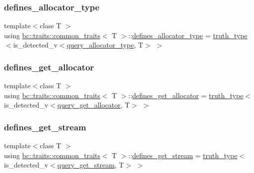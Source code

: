 \subsubsection{\texorpdfstring{defines\+\_\+allocator\+\_\+type}{defines\_allocator\_type}}
{\footnotesize\ttfamily template$<$class T $>$ \\
using \hyperlink{structbc_1_1traits_1_1common__traits}{bc\+::traits\+::common\+\_\+traits}$<$ T $>$\+::\hyperlink{structbc_1_1traits_1_1common__traits_a34ec53adbbda52eb2f30cb3ea1e07aac}{defines\+\_\+allocator\+\_\+type} =  \hyperlink{namespacebc_1_1traits_ac91a9795000ae7f483efbaf74c9872e8}{truth\+\_\+type}$<$is\+\_\+detected\+\_\+v$<$\hyperlink{namespacebc_1_1traits_ab141f0cc8348b4b7ebcb48e6bbb50d09}{query\+\_\+allocator\+\_\+type}, T$>$ $>$}

\mbox{\label{structbc_1_1traits_1_1common__traits_a411e56449816c80e601cd7b0a177d274}} 
\subsubsection{\texorpdfstring{defines\+\_\+get\+\_\+allocator}{defines\_get\_allocator}}
{\footnotesize\ttfamily template$<$class T $>$ \\
using \hyperlink{structbc_1_1traits_1_1common__traits}{bc\+::traits\+::common\+\_\+traits}$<$ T $>$\+::\hyperlink{structbc_1_1traits_1_1common__traits_a411e56449816c80e601cd7b0a177d274}{defines\+\_\+get\+\_\+allocator} =  \hyperlink{namespacebc_1_1traits_ac91a9795000ae7f483efbaf74c9872e8}{truth\+\_\+type}$<$is\+\_\+detected\+\_\+v$<$\hyperlink{namespacebc_1_1traits_a7843a6596fe24415ac9e5eb4d804726a}{query\+\_\+get\+\_\+allocator}, T$>$ $>$}

\mbox{\label{structbc_1_1traits_1_1common__traits_a4446bc2c0010c6a2a4062fff4970a7e1}} 
\subsubsection{\texorpdfstring{defines\+\_\+get\+\_\+stream}{defines\_get\_stream}}
{\footnotesize\ttfamily template$<$class T $>$ \\
using \hyperlink{structbc_1_1traits_1_1common__traits}{bc\+::traits\+::common\+\_\+traits}$<$ T $>$\+::\hyperlink{structbc_1_1traits_1_1common__traits_a4446bc2c0010c6a2a4062fff4970a7e1}{defines\+\_\+get\+\_\+stream} =  \hyperlink{namespacebc_1_1traits_ac91a9795000ae7f483efbaf74c9872e8}{truth\+\_\+type}$<$is\+\_\+detected\+\_\+v$<$\hyperlink{namespacebc_1_1traits_ae56dfced2583c1fbec104bcbdc2f1b44}{query\+\_\+get\+\_\+stream}, T$>$ $>$}

